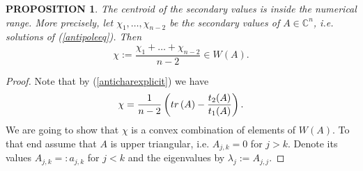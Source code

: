 \documentclass[10pt,a4paper,reqno]{amsart}
\newtheorem{prop}[defi]{\bf P\scriptsize ROPOSITION \normalsize}
\newenvironment{proposition}{\begin{prop}\it}{\end{prop}}
\newcommand{\zav}[1]{\left( #1 \right)}
\newcommand{\tr}{{\rm tr}\,}
\begin{document}
\begin{proposition}The centroid of the secondary values is inside the numerical range. More precisely,
let $\chi_1,\dots, \chi_{n-2}$ be the secondary values of $A\in\mathbb{C}^n$, i.e. solutions of (\ref{antipoleeq}). Then
\begin{equation}
\chi:=\frac{\chi_1+\dots+\chi_{n-2}}{n-2}\in W(A).
\end{equation}
\end{proposition}
\begin{proof}
Note that by (\ref{anticharexplicit}) we have
$$
\chi=\frac{1}{n-2}\zav{\tr(A)-\frac{t_2(A)}{t_1(A)}}.
$$
We are going to show that $\chi$ is a convex combination of elements of $W(A)$. To that end assume that $A$ is upper triangular, i.e. 
$A_{j,k}=0$ for $j>k$. Denote its values $A_{j,k}=:a_{j,k}$ for $j<k$ and the eigenvalues by $\lambda_j:=A_{j,j}$.


\end{proof}
\end{document}
